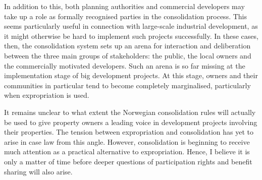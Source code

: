 In addition to this, both planning authorities and commercial developers may take up a role as formally recognised parties in the consolidation process. This seems particularly useful in connection with large-scale industrial development, as it might otherwise be hard to implement such projects successfully. In these cases, then, the consolidation system sets up an arena for interaction and deliberation between the three main groups of stakeholders: the public, the local owners and the commercially motivated developers. Such an arena is so far missing at the implementation stage of big development projects. At this stage, owners and their communities in particular tend to become completely marginalised, particularly when expropriation is used.

It remains unclear to what extent the Norwegian consolidation rules will actually be used to give property owners a leading voice in development projects involving their properties. The tension between expropriation and consolidation has yet to arise in case law from this angle. However, consolidation is beginning to receive much attention as a practical alternative to expropriation. Hence, I believe it is only a matter of time before deeper questions of participation rights and benefit sharing will also arise.

